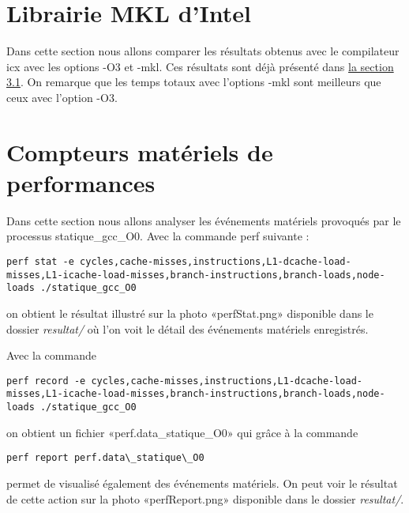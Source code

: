 \documentclass{rapport}
\begin{document}
\part{Librairie MKL d'Intel}
Dans cette section nous allons comparer les résultats obtenus avec le compilateur icx avec les options -O3 et -mkl. Ces résultats sont déjà présenté dans \hyperref[sec:mkl]{la section 3.1}. On remarque que les temps totaux avec l'options -mkl sont meilleurs que ceux avec l'option -O3.

\part{Compteurs matériels de performances}
Dans cette section nous allons analyser les événements matériels provoqués par le processus statique\_gcc\_O0.
Avec la commande perf suivante :
\begin{lstlisting}
perf stat -e cycles,cache-misses,instructions,L1-dcache-load-misses,L1-icache-load-misses,branch-instructions,branch-loads,node-loads ./statique_gcc_O0
\end{lstlisting}
on obtient le résultat illustré sur la photo «perfStat.png» disponible dans le dossier \textit{resultat/} où l'on voit le détail des événements matériels enregistrés.

Avec la commande %
\begin{lstlisting}
perf record -e cycles,cache-misses,instructions,L1-dcache-load-misses,L1-icache-load-misses,branch-instructions,branch-loads,node-loads ./statique_gcc_O0
\end{lstlisting}
on obtient un fichier «perf.data\_statique\_O0» qui grâce à la commande 
\begin{lstlisting}
perf report perf.data\_statique\_O0
\end{lstlisting}
permet de visualisé également des événements matériels. On peut voir le résultat de cette action sur la photo «perfReport.png» disponible dans le dossier \textit{resultat/}.
\end{document}
